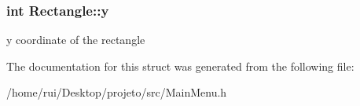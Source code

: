\subsubsection[{\texorpdfstring{y}{y}}]{\setlength{\rightskip}{0pt plus 5cm}int Rectangle\+::y}\hypertarget{structRectangle_acfb20b2cecf8c9701fb12fbbfebe6cea}{}\label{structRectangle_acfb20b2cecf8c9701fb12fbbfebe6cea}
y coordinate of the rectangle 

The documentation for this struct was generated from the following file\+:\begin{DoxyCompactItemize}
\item 
/home/rui/\+Desktop/projeto/src/Main\+Menu.\+h\end{DoxyCompactItemize}
